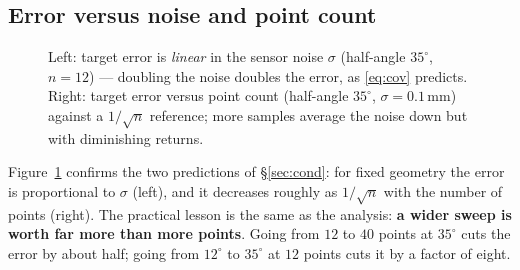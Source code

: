 \documentclass[11pt,a4paper]{article}
\begin{document}
\subsection{Error versus noise and point count}

\begin{figure}[h]
\centering
\begin{minipage}{0.48\textwidth}
\centering
{}
\end{minipage}\hfill
\begin{minipage}{0.48\textwidth}
\centering
{}
\end{minipage}
\caption{Left: target error is \emph{linear} in the sensor noise $\sigma$
(half-angle $35^\circ$, $n=12$) --- doubling the noise doubles the error, as
\eqref{eq:cov} predicts. Right: target error versus point count (half-angle
$35^\circ$, $\sigma=0.1$\,mm) against a $1/\sqrt{n}$ reference; more samples average
the noise down but with diminishing returns.}
\label{fig:noise-n}
\end{figure}

Figure~\ref{fig:noise-n} confirms the two predictions of \S\ref{sec:cond}: for
fixed geometry the error is proportional to $\sigma$ (left), and it decreases
roughly as $1/\sqrt{n}$ with the number of points (right). The practical lesson is
the same as the analysis: \textbf{a wider sweep is worth far more than more
points}. Going from $12$ to $40$ points at $35^\circ$ cuts the error by about half;
going from $12^\circ$ to $35^\circ$ at $12$ points cuts it by a factor of eight.
\end{document}
